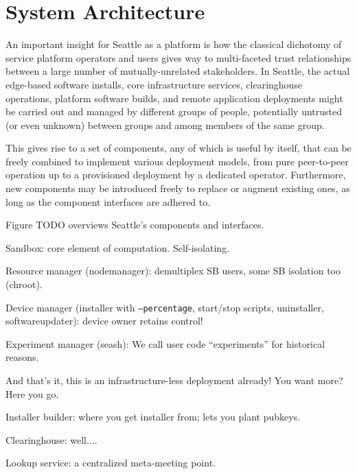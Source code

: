 \section{System Architecture}

An important insight for Seattle as a platform is how the classical
dichotomy of service platform operators and users gives way to multi-faceted
trust relationships between a large number of mutually-unrelated
stakeholders.
In Seattle, the actual edge-based software installs, core infrastructure
services, clearinghouse operations, platform software builds, and remote
application deployments might be carried out and managed by different
groups of people, potentially untrusted (or even unknown) between groups
and among members of the same group.

This gives rise to a set of components, any of which is useful
by itself, that can be freely combined to implement various
deployment models, from pure peer-to-peer operation up to a
provisioned deployment by a dedicated operator. Furthermore,
new components may be introduced freely to replace or augment
existing ones, as long as the component interfaces are adhered to.


Figure TODO overviews Seattle's components and interfaces.

Sandbox: core element of computation. Self-isolating.

Resource manager (nodemanager): demultiplex SB users, some SB isolation too (chroot).

Device manager (installer with \texttt{--percentage}, start/stop scripts, uninstaller, softwareupdater): device owner retains control!

Experiment manager (seash): We call user code ``experiments'' for historical reasons.

And that's it, this is an infrastructure-less deployment already!
You want more? Here you go.

Installer builder: where you get installer from; lets you plant pubkeys.

Clearinghouse: well....

Lookup service: a centralized meta-meeting point.



